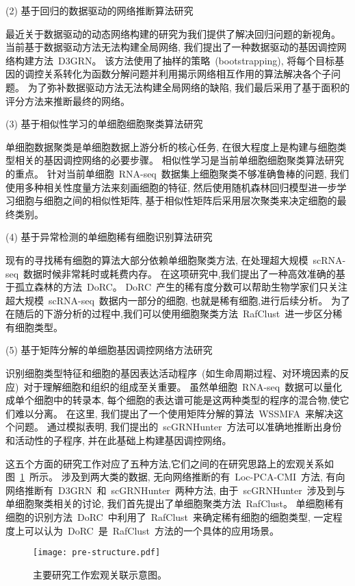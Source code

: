 (2) 基于回归的数据驱动的网络推断算法研究

最近关于数据驱动的动态网络构建的研究为我们提供了解决回归问题的新视角。
当前基于数据驱动方法无法构建全局网络,
我们提出了一种数据驱动的基因调控网络构建方法~D3GRN。
该方法使用了抽样的策略~(bootstrapping),
将每个目标基因的调控关系转化为函数分解问题并利用揭示网络相互作用的算法解决各个子问题。
为了弥补数据驱动方法无法构建全局网络的缺陷,
我们最后采用了基于面积的评分方法来推断最终的网络。


(3) 基于相似性学习的单细胞细胞聚类算法研究

单细胞数据聚类是单细胞数据上游分析的核心任务, 
在很大程度上是构建与细胞类型相关的基因调控网络的必要步骤。
相似性学习是当前单细胞细胞聚类算法研究的重点。
针对当前单细胞~RNA-seq~数据集上细胞聚类不够准确鲁棒的问题,
我们使用多种相关性度量方法来刻画细胞的特征, 
然后使用随机森林回归模型进一步学习细胞与细胞之间的相似性矩阵,
基于相似性矩阵后采用层次聚类来决定细胞的最终类别。

(4) 基于异常检测的单细胞稀有细胞识别算法研究

现有的寻找稀有细胞的算法大部分依赖单细胞聚类方法,
在处理超大规模~scRNA-seq~数据时候非常耗时或耗费内存。
在这项研究中,我们提出了一种高效准确的基于孤立森林的方法~DoRC。
DoRC~产生的稀有度分数可以帮助生物学家们只关注超大规模~scRNA-seq~数据内一部分的细胞, 也就是稀有细胞,进行后续分析。
为了在随后的下游分析的过程中,我们可以使用细胞聚类方法~RafClust~进一步区分稀有细胞类型。

(5) 基于矩阵分解的单细胞基因调控网络方法研究

识别细胞类型特征和细胞的基因表达活动程序~(如生命周期过程、对环境因素的反应)~对于理解细胞和组织的组成至关重要。
虽然单细胞~RNA-seq~数据可以量化成单个细胞中的转录本,
每个细胞的表达谱可能是这两种类型的程序的混合物,使它们难以分离。
在这里, 我们提出了一个使用矩阵分解的算法~WSSMFA~来解决这个问题。
通过模拟表明, 我们提出的~scGRNHunter~方法可以准确地推断出身份和活动性的子程序, 
并在此基础上构建基因调控网络。

这五个方面的研究工作对应了五种方法,它们之间的在研究思路上的宏观关系如图~\ref{fig:pre-structure}~所示。
涉及到两大类的数据, 无向网络推断的有~Loc-PCA-CMI~方法, 有向网络推断有~D3GRN~和~scGRNHunter~两种方法, 
由于~scGRNHunter~涉及到与单细胞聚类相关的讨论, 我们首先提出了单细胞聚类方法~RafClust。
单细胞稀有细胞的识别方法~DoRC~中利用了~RafClust~来确定稀有细胞的细胞类型,
一定程度上可以认为~DoRC~是~RafClust~方法的一个具体的应用场景。
\begin{figure}[!htbp]
    \centering
    \texttt{[image: pre-structure.pdf]}
    \caption{主要研究工作宏观关联示意图。
    }
    \label{fig:pre-structure}
\end{figure}

